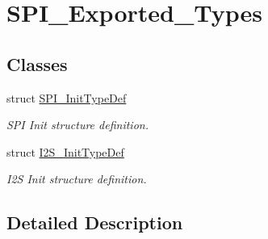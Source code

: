\hypertarget{group___s_p_i___exported___types}{}\section{S\+P\+I\+\_\+\+Exported\+\_\+\+Types}
\label{group___s_p_i___exported___types}
\subsection*{Classes}
\begin{DoxyCompactItemize}
\item 
struct \hyperlink{struct_s_p_i___init_type_def}{S\+P\+I\+\_\+\+Init\+Type\+Def}
\begin{DoxyCompactList}\small\item\em S\+PI Init structure definition. \end{DoxyCompactList}\item 
struct \hyperlink{struct_i2_s___init_type_def}{I2\+S\+\_\+\+Init\+Type\+Def}
\begin{DoxyCompactList}\small\item\em I2S Init structure definition. \end{DoxyCompactList}\end{DoxyCompactItemize}


\subsection{Detailed Description}
